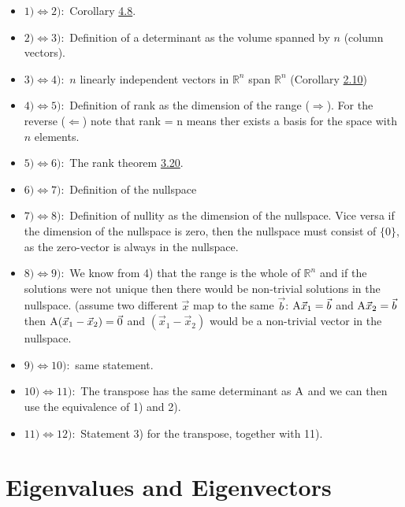 \documentclass[
  a4paper,
  DIV=11,
  numbers=noendperiod,
  oneside]{scrreprt}
\providecommand{\tightlist}{%
  \setlength{\itemsep}{0pt}\setlength{\parskip}{0pt}}
\theoremstyle{definition}
\theoremstyle{remark}
\newenvironment{fbx}[3]{\begin{tcolorbox}[enhanced, breakable,%
attach boxed title to top*={xshift=1.4pt},
boxed title style={boxrule=0.0mm, fuzzy shadow={1pt}{-1pt}{0mm}{0.1mm}{gray}, arc=.3em, rounded corners=east, sharp corners=west}, colframe=#1-color2, colbacktitle=#1-color1, colback = white, coltitle=black,  titlerule=0mm, toprule=0pt, bottomrule=.7pt, leftrule=.3em, rightrule=0pt, outer arc=.3em,  arc=0pt,	 sharp corners = east, left=.5em, bottomtitle=1mm, toptitle=1mm,title=\textbf{#2}\hspace{0.5em}{#3}]}
{\end{tcolorbox}}
\begin{document}
\label{Proofux2a-4.11}
\begin{fbx}{Proof}{Proof}{}
\label{Proof*-4.11}

\begin{itemize}
\tightlist
\item
  \(1) \Leftrightarrow 2):\) Corollary \hyperref[invdet]{4.8}.
\item
  \(2) \Leftrightarrow 3):\) Definition of a determinant as the volume
  spanned by \(n\) (column vectors).
\item
  \(3) \Leftrightarrow 4):\) \(n\) linearly independent vectors in
  \(\mathbb{R}^n\) span \(\mathbb{R}^n\) (Corollary
  \hyperref[nvectorsspanrn]{2.10})
\item
  \(4) \Leftrightarrow 5):\) Definition of rank as the dimension of the
  range (\(\Rightarrow\)). For the reverse (\(\Leftarrow\)) note that
  rank = n means ther exists a basis for the space with \(n\) elements.
\item
  \(5) \Leftrightarrow 6):\) The rank theorem
  \hyperref[ranktheorem]{3.20}.
\item
  \(6) \Leftrightarrow 7):\) Definition of the nullspace
\item
  \(7) \Leftrightarrow 8):\) Definition of nullity as the dimension of
  the nullspace. Vice versa if the dimension of the nullspace is zero,
  then the nullspace must consist of \(\{0 \}\), as the zero-vector is
  always in the nullspace.
\item
  \(8) \Leftrightarrow 9):\) We know from 4) that the range is the whole
  of \(\mathbb{R}^n\) and if the solutions were not unique then there
  would be non-trivial solutions in the nullspace. (assume two different
  \(\vec{x}\) map to the same \(\vec{b}\): \({\rm A}\vec{x}_1= \vec{b}\)
  and \({\rm A}\vec{x}_2= \vec{b}\) then
  \({\rm A}(\vec{x}_1  -\vec{x}_2)= \vec{0}\) and
  \((\vec{x}_1  -\vec{x}_2)\) would be a non-trivial vector in the
  nullspace.
\item
  \(9) \Leftrightarrow 10):\) same statement.
\item
  \(10) \Leftrightarrow 11):\) The transpose has the same determinant as
  \({\rm A}\) and we can then use the equivalence of 1) and 2).
\item
  \(11) \Leftrightarrow 12):\) Statement 3) for the transpose, together
  with 11).
\end{itemize}

\end{fbx}

\chapter{Eigenvalues and
Eigenvectors}\label{eigenvalues-and-eigenvectors}
\end{document}
